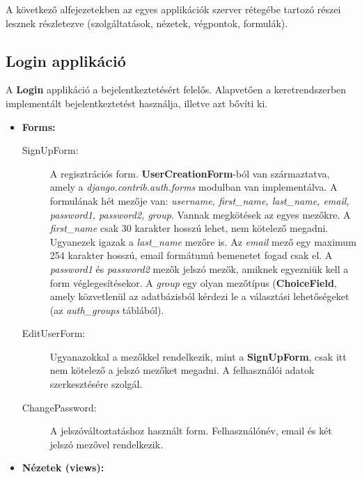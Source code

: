A következő alfejezetekben az egyes applikációk szerver rétegébe tartozó részei lesznek részletezve (szolgáltatások, nézetek, végpontok, formulák).

\subsection{Login applikáció}

A \textbf{Login} applikáció a bejelentkeztetésért felelős. Alapvetően a keretrendszerben implementált bejelentkeztetést használja, illetve azt bővíti ki.

\begin{itemize}
	\item \textbf{Forms:}

	\begin{description}
		\item[SignUpForm:] A regisztrációs form. \textbf{UserCreationForm}-ból van származtatva, amely a \textit{django.contrib.auth.forms} modulban van implementálva. A formulának hét mezője van: \textit{username, first\_name, last\_name, email, password1, password2, group}. Vannak megkötések az egyes mezőkre. A \textit{first\_name} csak 30 karakter hosszú lehet, nem kötelező megadni. Ugyanezek igazak a \textit{last\_name} mezőre is. Az \textit{email} mező egy maximum 254 karakter hosszú, email formátumú bemenetet fogad csak el. A \textit{password1} és \textit{password2} mezők jelszó mezők, amiknek egyezniük kell a form véglegesítésekor. A \textit{group} egy olyan mezőtípus (\textbf{ChoiceField}, amely közvetlenül az adatbázisból kérdezi le a választási lehetőségeket (az \textit{auth\_groups} táblából).
		\item[EditUserForm:] Ugyanazokkal a mezőkkel rendelkezik, mint a \textbf{SignUpForm}, csak itt nem kötelező a jelszó mezőket megadni. A felhasználói adatok szerkesztésére szolgál.
		\item[ChangePassword:] A jelszóváltoztatáshoz használt form. Felhasználónév, email és két jelszó mezővel rendelkezik.
	\end{description}

	\item \textbf{Nézetek (views):}


\end{itemize}
